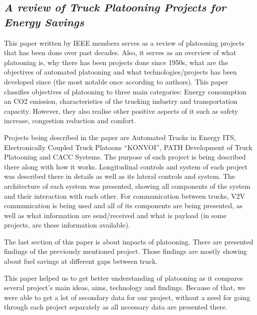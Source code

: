 \subsection{\textit{A review of Truck Platooning Projects for Energy Savings}}

This paper \cite{Tsugawa2016ASavings} written by IEEE members serves as a review of platooning projects that has been done over past decades. Also, it serves as an overview of what platooning is, why there has been projects done since 1950s, what are the objectives of automated platooning and what technologies/projects has been developed since (the most notable once according to authors).
This paper classifies objectives of platooning to three main categories: Energy consumption an CO2 emission, characteristics of the trucking industry and transportation capacity. However, they also realise other positive aspects of it such as safety increase, congestion reduction and comfort.\par
% 
% 
Projects being described in the paper are Automated Trucks in Energy ITS, Electronically Coupled Truck Platoons “KONVOI”, PATH Development of Truck Platooning and CACC Systems. The purpose of each project is being described there along with how it works. Longitudinal controls and system of each project was described there in details as well as its lateral controls and system. The architecture of each system was presented, showing all components of the system and their interaction with each other. For communication between trucks, V2V communication is being used and all of its components are being presented, as well as what information are send/received and what is payload (in some projects, are these information available).\par
% 
% 
The last section of this paper is about impacts of platooning. There are presented findings of the previously mentioned project. Those findings are mostly showing about fuel savings at different gaps between truck.\par
% 
% 
This paper helped us to get better understanding of platooning as it compares several project’s main ideas, aims, technology and findings. Because of that, we were able to get a lot of secondary data for our project, without a need for going through each project separately as all necessary data are presented there.
